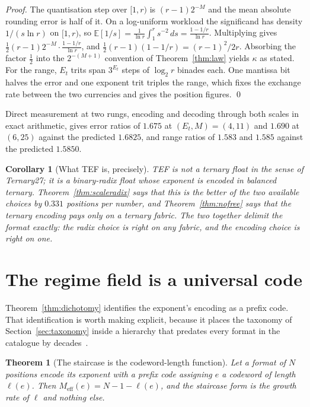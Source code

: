 \documentclass[11pt]{article}
\newtheorem{theorem}{Theorem}
\newtheorem{corollary}{Corollary}
\theoremstyle{definition}
\begin{document}
\begin{proof}
The quantisation step over $[1,r)$ is $(r-1)2^{-M}$ and the mean absolute
rounding error is half of it. On a log-uniform workload the significand has
density $1/(s\ln r)$ on $[1,r)$, so
$\mathbb{E}[1/s] = \frac{1}{\ln r}\int_1^{r} s^{-2}\,ds = \frac{1-1/r}{\ln r}$.
Multiplying gives $\tfrac12 (r-1)2^{-M}\cdot\frac{1-1/r}{\ln r}$, and
$\tfrac12(r-1)(1-1/r) = (r-1)^2/2r$. Absorbing the factor $\tfrac12$ into the
$2^{-(M+1)}$ convention of Theorem~\ref{thm:law} yields $\kappa$ as stated. For
the range, $E_t$ trits span $3^{E_t}$ steps of $\log_2 r$ binades each. One
mantissa bit halves the error and one exponent trit triples the range, which
fixes the exchange rate between the two currencies and gives the position
figures. \qed
\end{proof}

Direct measurement at two rungs, encoding and decoding through both scales in
exact arithmetic, gives error ratios of $1.675$ at $(E_t,M) = (4,11)$ and $1.690$
at $(6,25)$ against the predicted $1.6825$, and range ratios of $1.583$ and
$1.585$ against the predicted $1.5850$.

\begin{corollary}[What TEF is, precisely]
TEF is not a ternary float in the sense of Ternary27; it is a binary-radix float
whose exponent is \emph{encoded} in balanced ternary. Theorem~\ref{thm:scaleradix}
says that this is the better of the two available choices by $0.331$ positions per
number, and Theorem~\ref{thm:nofree} says that the ternary encoding pays only on a
ternary fabric. The two together delimit the format exactly: the radix choice is
right on any fabric, and the encoding choice is right on one.
\end{corollary}


\section{The regime field is a universal code}
\label{sec:codes}

Theorem~\ref{thm:dichotomy} identifies the exponent's encoding as a prefix code.
That identification is worth making explicit, because it places the taxonomy of
Section~\ref{sec:taxonomy} inside a hierarchy that predates every format in the
catalogue by decades~\cite{elias1975}.

\begin{theorem}[The staircase is the codeword-length function]
\label{thm:code}
Let a format of $N$ positions encode its exponent with a prefix code assigning
$e$ a codeword of length $\ell(e)$. Then
$M_{\mathrm{eff}}(e) = N - 1 - \ell(e)$, and the staircase form is the growth
rate of $\ell$ and nothing else.
\end{theorem}
\end{document}
